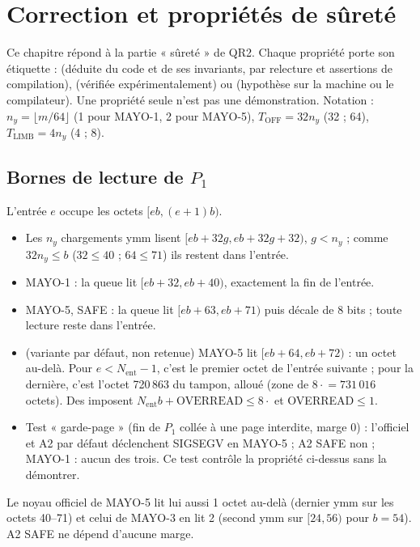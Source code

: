 \chapter{Correction et propriétés de sûreté}
\label{ch:surete}

Ce chapitre répond à la partie « sûreté » de QR2. Chaque propriété porte son étiquette : \Pc{} (déduite du code et de ses invariants, par relecture et assertions de compilation), \Pe{} (vérifiée expérimentalement) ou \Hy{} (hypothèse sur la machine ou le compilateur). Une propriété \Pe{} seule n'est pas une démonstration. Notation : $n_y=\lfloor m/64\rfloor$ (1 pour MAYO-1, 2 pour MAYO-5), $T_{\mathrm{OFF}}=32n_y$ (32 ; 64), $T_{\mathrm{LIMB}}=4n_y$ (4 ; 8).

\section{Bornes de lecture de $P_1$}
L'entrée $e$ occupe les octets $[eb,(e+1)b)$.
\begin{itemize}
\item \Pc{} Les $n_y$ chargements ymm lisent $[eb+32g,eb+32g+32)$, $g<n_y$ ; comme $32n_y\le b$ ($32\le40$ ; $64\le71$) ils restent dans l'entrée.
\item \Pc{} MAYO-1 : la queue lit $[eb+32,eb+40)$, exactement la fin de l'entrée.
\item \Pc{} MAYO-5, SAFE : la queue lit $[eb+63,eb+71)$ puis décale de 8 bits ; toute lecture reste dans l'entrée.
\item \Pc{} (variante par défaut, non retenue) MAYO-5 lit $[eb+64,eb+72)$ : un octet au-delà. Pour $e<N_{\mathrm{ent}}-1$, c'est le premier octet de l'entrée suivante ; pour la dernière, c'est l'octet 720\,863 du tampon, alloué (zone de $8\cdot$$=731\,016$ octets). Des  imposent $N_{\mathrm{ent}}b+\text{OVERREAD}\le8\cdot$ et OVERREAD$\le1$.
\item \Pe{} Test « garde-page » (fin de $P_1$ collée à une page interdite, marge 0) : l'officiel et A2 par défaut déclenchent SIGSEGV en MAYO-5 ; A2 SAFE non ; MAYO-1 : aucun des trois. Ce test contrôle la propriété ci-dessus sans la démontrer.
\end{itemize}
Le noyau officiel de MAYO-5 lit lui aussi 1 octet au-delà (dernier ymm sur les octets 40--71) et celui de MAYO-3 en lit 2 (second ymm sur $[24,56)$ pour $b=54$). A2 SAFE ne dépend d'aucune marge.

